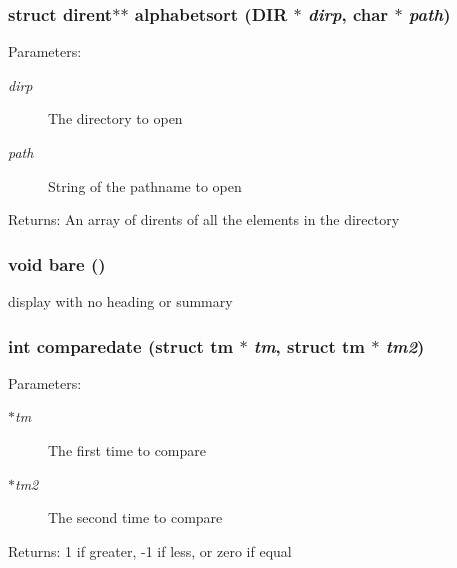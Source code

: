\subsubsection{\setlength{\rightskip}{0pt plus 5cm}struct dirent$\ast$$\ast$ alphabetsort (DIR $\ast$ {\em dirp}, char $\ast$ {\em path})}\label{dir_8c_2684b144ccffca43c2bd84d19795f700}


\begin{Desc}
\item[Parameters:]
\begin{description}
\item[{\em dirp}]The directory to open \item[{\em path}]String of the pathname to open \end{description}
\end{Desc}
\begin{Desc}
\item[Returns:]An array of dirents of all the elements in the directory \end{Desc}
\subsubsection{\setlength{\rightskip}{0pt plus 5cm}void bare ()}\label{dir_8c_d4957954133b9e627d0b769ea5851a4b}


display with no heading or summary 
\subsubsection{\setlength{\rightskip}{0pt plus 5cm}int comparedate (struct tm $\ast$ {\em tm}, struct tm $\ast$ {\em tm2})}\label{dir_8c_e080fb0b0c9f9f1b39792d9c03f7ad11}


\begin{Desc}
\item[Parameters:]
\begin{description}
\item[{\em $\ast$tm}]The first time to compare \item[{\em $\ast$tm2}]The second time to compare \end{description}
\end{Desc}
\begin{Desc}
\item[Returns:]1 if greater, -1 if less, or zero if equal \end{Desc}
